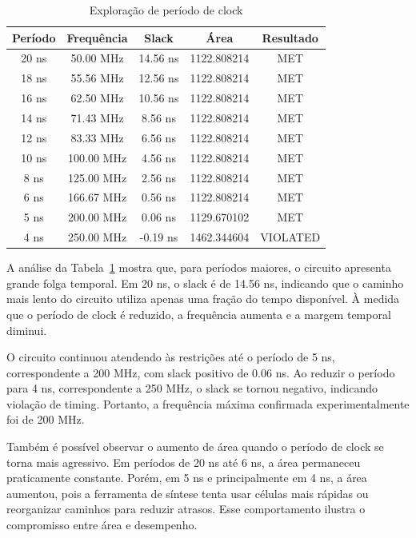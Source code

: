 \documentclass[11pt,a4paper]{article}
\begin{document}
\begin{table}[H]
\centering
\caption{Exploração de período de clock}
\label{tab:exploracao_clock}
\footnotesize
\begin{tabular}{ccccc}
\toprule
\textbf{Período} & \textbf{Frequência} & \textbf{Slack} & \textbf{Área} & \textbf{Resultado} \\
\midrule
20 ns & 50.00 MHz  & 14.56 ns  & 1122.808214 & MET \\
18 ns & 55.56 MHz  & 12.56 ns  & 1122.808214 & MET \\
16 ns & 62.50 MHz  & 10.56 ns  & 1122.808214 & MET \\
14 ns & 71.43 MHz  & 8.56 ns   & 1122.808214 & MET \\
12 ns & 83.33 MHz  & 6.56 ns   & 1122.808214 & MET \\
10 ns & 100.00 MHz & 4.56 ns   & 1122.808214 & MET \\
8 ns  & 125.00 MHz & 2.56 ns   & 1122.808214 & MET \\
6 ns  & 166.67 MHz & 0.56 ns   & 1122.808214 & MET \\
5 ns  & 200.00 MHz & 0.06 ns   & 1129.670102 & MET \\
4 ns  & 250.00 MHz & -0.19 ns  & 1462.344604 & VIOLATED \\
\bottomrule
\end{tabular}
\end{table}

A análise da Tabela~\ref{tab:exploracao_clock} mostra que, para períodos maiores, o circuito apresenta grande folga temporal. Em 20 ns, o slack é de 14.56 ns, indicando que o caminho mais lento do circuito utiliza apenas uma fração do tempo disponível. À medida que o período de clock é reduzido, a frequência aumenta e a margem temporal diminui.

O circuito continuou atendendo às restrições até o período de 5 ns, correspondente a 200 MHz, com slack positivo de 0.06 ns. Ao reduzir o período para 4 ns, correspondente a 250 MHz, o slack se tornou negativo, indicando violação de timing. Portanto, a frequência máxima confirmada experimentalmente foi de 200 MHz.

Também é possível observar o aumento de área quando o período de clock se torna mais agressivo. Em períodos de 20 ns até 6 ns, a área permaneceu praticamente constante. Porém, em 5 ns e principalmente em 4 ns, a área aumentou, pois a ferramenta de síntese tenta usar células mais rápidas ou reorganizar caminhos para reduzir atrasos. Esse comportamento ilustra o compromisso entre área e desempenho.
\end{document}
